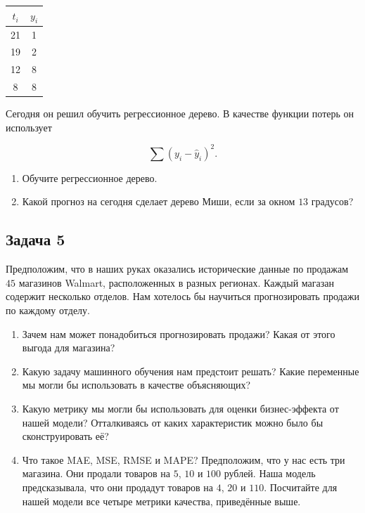 \documentclass[12pt, a4paper, oneside]{article}
\begin{document}
\begin{center}
	\begin{tabular}{c|c}
		\hline
		$t_i$ & $y_i$ \\
		\hline
		21 &  1 \\
		19 & 2 \\
		12 & 8 \\
	     8 & 8 \\
	\end{tabular}
\end{center}

Сегодня он решил обучить регрессионное дерево. В качестве функции потерь он использует 

\[ \sum (y_i - \hat y_i)^2. \]

\begin{enumerate}
	\item Обучите регрессионное дерево.
	\item Какой прогноз на сегодня сделает дерево Миши, если за окном $13$ градусов? 
\end{enumerate}


\subsection*{Задача 5}

Предположим, что в наших руках оказались исторические данные по продажам $45$ магазинов Walmart, расположенных в разных регионах. Каждый магазан содержит несколько отделов.  Нам хотелось бы научиться прогнозировать продажи по каждому отделу. 

\begin{enumerate}
	\item  Зачем нам может понадобиться прогнозировать продажи? Какая от этого выгода для магазина? 
	\item Какую задачу машинного обучения нам предстоит решать? Какие переменные мы могли бы использовать в качестве объясняющих? 
	\item Какую метрику мы могли бы использовать для оценки бизнес-эффекта от нашей модели? Отталкиваясь от каких характеристик можно было бы сконструировать её? 
	\item  Что такое MAE, MSE,  RMSE и MAPE?  Предположим, что у нас есть три магазина. Они продали товаров на $5$, $10$ и $100$  рублей.  Наша модель предсказывала, что они продадут товаров на  $4$, $20$ и $110$. Посчитайте для нашей модели все четыре метрики качества, приведённые выше. 
\end{enumerate}
\end{document}
